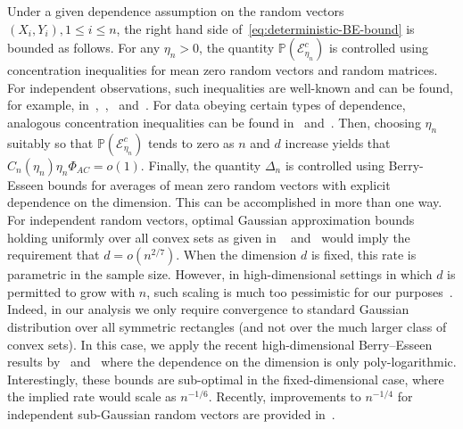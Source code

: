 \documentclass[11pt]{article}
\begin{document}
Under a given dependence assumption on the random vectors $(X_i, Y_i), 1\le i\le n$, the right hand side of~\eqref{eq:deterministic-BE-bound} is bounded as follows. For any $\eta_n > 0$, the quantity $\mathbb{P}(\mathcal{E}_{\eta_n}^c)$ is controlled using concentration inequalities for mean zero random vectors and random matrices. For independent observations, such  inequalities are well-known and can be found, for example, in~\cite{LED91},~\cite{einmahl2008characterization},~\cite{Ver12,Vershynin18} and~\cite{tropp2016expected}. For data obeying certain types of dependence, analogous concentration inequalities can be found in~\cite{Liu13} and~\citet[Section 5 and Appendix B]{Uniform:Kuch18}. Then, choosing $\eta_n$ suitably so that $\mathbb{P}(\mathcal{E}_{\eta_n}^c)$ tends to zero as $n$ and $d$ increase yields that $C_n(\eta_n)\eta_n\Phi_{AC} = o(1)$. Finally, the quantity $\Delta_n$ is controlled using Berry-Esseen bounds for averages of mean zero random vectors with explicit dependence on the dimension. This can be accomplished in more than one way. For independent random vectors, optimal Gaussian approximation bounds holding uniformly over all convex sets as given in ~\cite{bentkus2003dependence} and~\cite{raivc2019multivariate} would imply the requirement that $d = o(n^{2/7})$. When the dimension $d$ is fixed, this rate is parametric in the sample size. However, in high-dimensional settings in which $d$ is permitted to grow with $n$, such scaling is much too pessimistic for our purposes~\citep{MR1115160}. Indeed, in our analysis we only require convergence to standard Gaussian distribution over all symmetric rectangles (and not over the much larger class of convex sets). In this case, we apply the recent high-dimensional Berry--Esseen results by~\cite{Chern17} and~\cite{koike2019notes} \citep[and, for dependent observations, by][]{ZhangWu17} where the dependence on the dimension is only poly-logarithmic. Interestingly, these bounds are sub-optimal in the fixed-dimensional case, where the implied rate would scale as $n^{-1/6}$. Recently, improvements to $n^{-1/4}$ for independent sub-Gaussian random vectors are provided in~\cite{chernozhukov2019improved}. 
\end{document}

